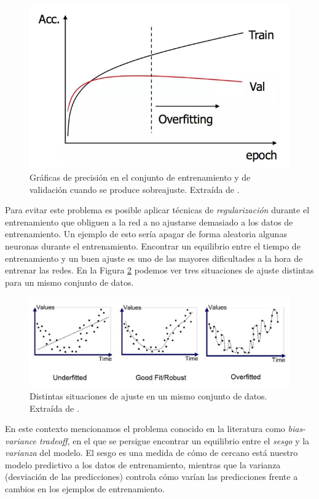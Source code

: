 \documentclass[
  a4paper,
  12pt,
  spanish,
]{scrartcl}
\theoremstyle{teorema-style}
\begin{document}
\begin{figure}[h]
  \centering
  \includegraphics[width=.7\textwidth]{img/overfitting}
  \caption{Gráficas de precisión en el conjunto de entrenamiento y de validación cuando se produce sobreajuste. Extraída de \parencite{quora_overfitting_2016}.}
  \label{fig:overfitting}
\end{figure}

Para evitar este problema es posible aplicar técnicas de \textit{regularización} durante el entrenamiento que obliguen a la red a no ajustarse demasiado a los datos de entrenamiento. Un ejemplo de esto sería apagar de forma aleatoria algunas neuronas durante el entrenamiento. Encontrar un equilibrio entre el tiempo de entrenamiento y un buen ajuste es uno de las mayores dificultades a la hora de entrenar las redes. En la Figura \ref{fig:fit} podemos ver tres situaciones de ajuste distintas para un mismo conjunto de datos.

\begin{figure}[h]
  \centering
  \includegraphics[width=.9\textwidth]{img/fit}
  \caption{Distintas situaciones de ajuste en un mismo conjunto de datos. Extraída de \parencite{bhande_fit_2018}.}
  \label{fig:fit}
\end{figure}

En este contexto mencionamos el problema conocido en la literatura como \textit{bias-variance tradeoff}, en el que se persigue encontrar un equilibrio entre el \textit{sesgo} y la \textit{varianza} del modelo. El sesgo es una medida de cómo de cercano está nuestro modelo predictivo a los datos de entrenamiento, mientras que la varianza (desviación de las predicciones) controla cómo varían las predicciones frente a cambios en los ejemplos de entrenamiento.
\end{document}
